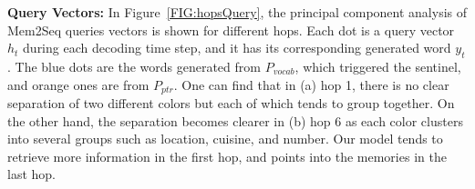 \documentclass[11pt,a4paper]{article}
\begin{document}
\noindent\textbf{Query Vectors:} In Figure~\ref{FIG:hopsQuery}, the principal component analysis of Mem2Seq queries vectors is shown for different hops. Each dot is a query vector $h_t$ during each decoding time step, and it has its corresponding generated word $y_t$. The blue dots are the words generated from $P_{vocab}$, which triggered the sentinel, and orange ones are from $P_{ptr}$. One can find that in (a) hop 1, there is no clear separation of two different colors but each of which tends to group together. On the other hand, the separation becomes clearer in (b) hop 6 as each color clusters into several groups such as location, cuisine, and number. Our model tends to retrieve more information in the first hop, and points into the memories in the last hop.

\begin{table}[t]
\centering
{}
\setlength{\abovecaptionskip}{-3pt} 
\caption{Example of generated responses for the In-Car Assistant on the scheduling domain.}
\label{EXAMPL_DIALOG_2}
\end{table}
\end{document}

